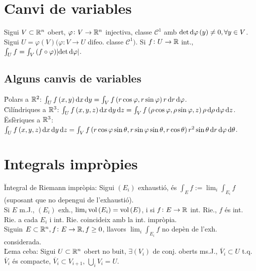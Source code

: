 \section{Canvi de variables}

\ci Sigui $V\subset\mathbb{R}^n$ obert, $\varphi\colon V\to\mathbb{R}^n$ injectiva, classe $\mathcal{C}^1$ amb $\det \dif \varphi\left( y \right) \neq 0, \forall y \in V$. Sigui $U = \varphi\left( V \right) (\varphi\colon V\to U$ difeo. classe $\mathcal{C}^1)$. Si $f\colon U\to \mathbb{R}$ int., $\int_U f = \int_V\left( f \circ \varphi \right)\abs{\det \dif \varphi}$.

\subsection{Alguns canvis de variables}
\u{Polars a $\mathbb{R}^2$}: $\int_U f\left( x,y \right) \dif x\dif y = \int_V f\left( r\cos\varphi, r\sin\varphi \right)r \dif r\dif \varphi$. \\
\u{Cilíndriques a $\mathbb{R}^3$}: $\int_U f\left( x,y,z \right) \dif x\dif y\dif z = \int_V f\left( \rho\cos\varphi, \rho\sin\varphi, z \right)\rho \dif \rho\dif \varphi\dif z$. \\
\u{Esfèriques a $\mathbb{R}^3$}: $\int_U f\left( x,y,z \right) \dif x\dif y\dif z = \int_V f\left( r\cos\varphi\sin\theta, r\sin\varphi\sin\theta, r\cos\theta \right) r^2\sin\theta \dif r\dif \varphi\dif \theta$.

\section{Integrals impròpies}

\u{Integral de Riemann impròpia}: Sigui $\left( E_i \right)$ exhaustió, \'es $\int_E f := \lim_i \int_{E_i} f$ (suposant que no depengui de l'exhaustió). \\
\ci Si $E$ m.J., $\left( E_i \right)$ exh., $\lim_i \operatorname{vol}\left( E_i \right) = \operatorname{vol} \left( E \right)$, i si $f\colon E\to\mathbb{R}$ int. Rie., $f$ \'es int. Rie. a cada $E_i$ i int. Rie. coincideix amb la int. impròpia. \\
\ci Siguin $E\subset\mathbb{R}^n, f\colon E\to \mathbb{R}, f \geq 0$, llavors $\lim_i\int_{E_i} f$ no depèn de l'exh. considerada. \\
\u{Lema ceba}: Sigui $U\subset\mathbb{R}^n$ obert no buit, $\exists (V_i)$ de conj. oberts ms.J., $\overline{V}_i \subset U$ t.q. $\overline{V}_i$ \'es compacte, $\overline{V}_i \subset V_{i+1}, \, \bigcup_i V_i = U$. \\

